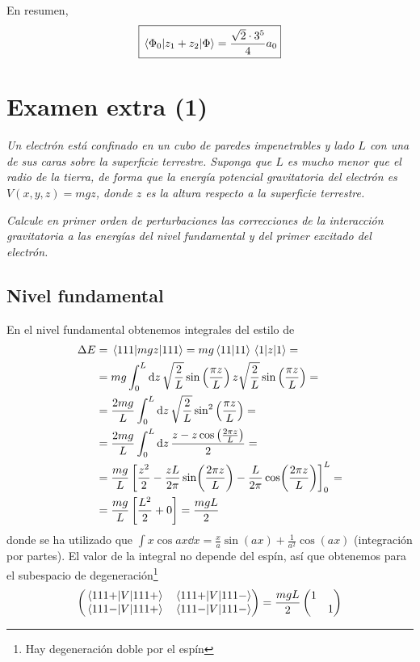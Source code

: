   En resumen,
  \begin{equation}
    \boxed{
      \mel{\Phi_0}{z_1+z_2}{\Phi} = \frac{\sqrt{2}\cdot 3^5}{4}a_0
    }
  \end{equation}

\chapter{Examen extra (1)}
\begin{tcolorbox}[halign=left]
  \emph{Un electrón está confinado en un cubo de paredes
    impenetrables y lado $L$ con una de sus caras sobre la
superficie terrestre. Suponga que $L$ es mucho menor que el radio de
la tierra, de forma que la energía potencial gravitatoria del electrón
es $V(x,y,z)=mgz$, donde $z$ es la altura respecto a la superficie
terrestre.}

\emph{Calcule en primer orden de perturbaciones las correcciones de la
interacción gravitatoria a las energías del nivel fundamental y del
primer excitado del electrón.}
\end{tcolorbox}

\section*{Nivel fundamental}



En el nivel fundamental obtenemos integrales del estilo de
\begin{equation}
  \begin{split}
    \Delta E &= \mel{111}{mgz}{111} = mg \ip{11}{11} \mel{1}{z}{1} =
    \\
    &= mg \int_0^L \dd{z} \sqrt{\frac{2}{L}} \sin \left( \frac{\pi z}{L} 
    \right) z \sqrt{\frac{2}{L}} \sin \left( \frac{\pi z}{L} \right)  =\\ 
&= \frac{2mg}{L} \int_0^L \dd{z} \sqrt{\frac{2}{L}} \sin^2 \left(
  \frac{\pi z}{L} \right) = \\
&= \frac{2mg}{L} \int_0^L \dd{z}\frac{z - z\cos \left( \frac{2\pi z}{L}
  \right)}{2} = \\ &= \frac{mg}{L}  
\left[ \frac{z^2}{2} - \frac{zL}{2\pi}\sin(\frac{2\pi z}{L}) - \frac{L}{2\pi}
  \cos(\frac{2\pi z}{L}) \right]_0^L  = \\
&= \frac{mg}{L} \left[ \frac{L^2}{2} + 0 \right] = \frac{mgL}{2}
  \end{split}
\end{equation}
donde se ha utilizado que $\int x\cos ax \dd{x} = \frac{x}{a} \sin(ax)
+ \frac{1}{a^2}\cos(ax) $ (integración por partes).
El valor de la integral no depende del espín, así que obtenemos para
el subespacio de degeneración\footnote{Hay degeneración doble por el
  espín}
\begin{equation}
  \begin{pmatrix}
    \mel{111+}{V}{111+} &  \mel{111+}{V}{111-} \\
    \mel{111-}{V}{111+} &  \mel{111-}{V}{111-}
  \end{pmatrix} =
  \frac{mgL}{2}
  \begin{pmatrix}
    1 &  \\ & 1
 \end{pmatrix}
\end{equation}

